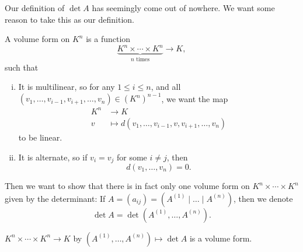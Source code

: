 \documentclass[12pt]{article}
\begin{document}
Our definition of $\det A$ has seemingly come out of nowhere. We want some reason to take this as our definition.

\begin{definition}
	A volume form on $K^{n}$ is a function
	\[
		\underbrace{K^{n} \times \cdots \times K^{n}}_{n \text{ times}} \to K
	,\]
	such that
	\begin{enumerate}[(i)]
		\item It is multilinear, so for any $1 \leq i \leq n$, and all $(v_1, \ldots, v_{i-1}, v_{i+1}, \ldots, v_n) \in (K^{n})^{n-1}$, we want the map
			\begin{align*}
				K^{n} &\to K \\
				v &\mapsto d(v_1, \ldots, v_{i-1}, v, v_{i+1}, \ldots, v_n)
			\end{align*}
			to be linear.
		\item It is alternate, so if $v_i = v_j$ for some $i \neq j$, then
			\[
				d(v_1, \ldots, v_n) = 0
			.\]
	\end{enumerate}
\end{definition}

Then we want to show that there is in fact only one volume form on $K^{n} \times \cdots \times K^{n}$ given by the determinant: If $A = (a_{ij}) = (A^{(1)} \mid \ldots \mid A^{(n)})$, then we denote
\[
	\det A = \det(A^{(1)}, \ldots, A^{(n)})
.\]
\begin{lemma}
	$K^{n} \times \cdots \times K^{n} \to K$ by $(A^{(1)}, \ldots, A^{(n)}) \mapsto \det A$ is a volume form.
\end{lemma}
\end{document}
